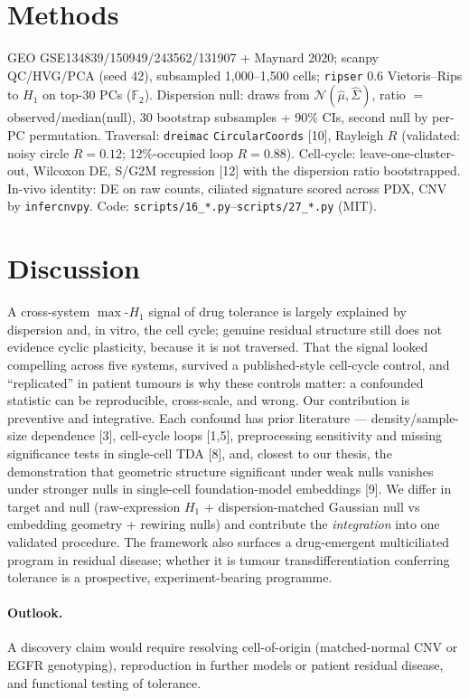 \documentclass[11pt,a4paper]{article}
\newcommand{\maxh}{\ensuremath{\max\text{-}H_1}}
\begin{document}
\section{Methods}
GEO GSE134839/150949/243562/131907 + Maynard 2020; scanpy QC/HVG/PCA (seed 42), subsampled
1{,}000--1{,}500 cells; \texttt{ripser} 0.6 Vietoris--Rips to $H_1$ on top-30 PCs ($\mathbb{F}_2$).
Dispersion null: draws from $\mathcal{N}(\hat\mu,\hat\Sigma)$, ratio $=$ observed/median(null), 30
bootstrap subsamples + 90\% CIs, second null by per-PC permutation. Traversal: \texttt{dreimac}
\texttt{CircularCoords} [10], Rayleigh $R$ (validated: noisy circle $R=0.12$; 12\%-occupied loop
$R=0.88$). Cell-cycle: leave-one-cluster-out, Wilcoxon DE, S/G2M regression [12] with the
dispersion ratio bootstrapped. In-vivo identity: DE on raw counts, ciliated signature scored across
PDX, CNV by \texttt{infercnvpy}. Code: \texttt{scripts/16\_*.py}--\texttt{scripts/27\_*.py} (MIT).

\section{Discussion}
A cross-system \maxh{} signal of drug tolerance is largely explained by dispersion and, in vitro,
the cell cycle; genuine residual structure still does not evidence cyclic plasticity, because it is
not traversed. That the signal looked compelling across five systems, survived a published-style
cell-cycle control, and ``replicated'' in patient tumours is why these controls matter: a confounded
statistic can be reproducible, cross-scale, and wrong. Our contribution is preventive and
integrative. Each confound has prior literature --- density/sample-size dependence [3], cell-cycle
loops [1,5], preprocessing sensitivity and missing significance tests in single-cell TDA [8], and,
closest to our thesis, the demonstration that geometric structure significant under weak nulls
vanishes under stronger nulls in single-cell foundation-model embeddings [9]. We differ in target
and null (raw-expression $H_1$ + dispersion-matched Gaussian null vs embedding geometry + rewiring
nulls) and contribute the \emph{integration} into one validated procedure. The framework also
surfaces a drug-emergent multiciliated program in residual disease; whether it is tumour
transdifferentiation conferring tolerance is a prospective, experiment-bearing programme.

\paragraph{Outlook.} A discovery claim would require resolving cell-of-origin (matched-normal CNV or
EGFR genotyping), reproduction in further models or patient residual disease, and functional testing
of tolerance.
\end{document}
